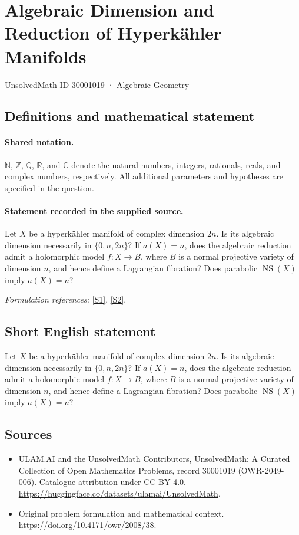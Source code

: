 \documentclass[11pt]{article}
\newcommand{\sref}[2]{\hyperlink{source:#1:#2}{[S#2]}}
\begin{document}
\setcounter{section}{30001018}
\section{Algebraic Dimension and Reduction of Hyperkähler Manifolds}\label{30001019}
{\small UnsolvedMath ID 30001019 · Algebraic Geometry}
\subsection{Definitions and mathematical statement}

\paragraph{Shared notation.}$\mathbb N$, $\mathbb Z$, $\mathbb Q$, $\mathbb R$, and $\mathbb C$ denote the natural numbers, integers, rationals, reals, and complex numbers, respectively. All additional parameters and hypotheses are specified in the question.


\paragraph{Statement recorded in the supplied source.}
Let $X$ be a hyperkähler manifold of complex dimension $2n$. Is its algebraic dimension necessarily in $\{0,n,2n\}$? If $a(X)=n$, does the algebraic reduction admit a holomorphic model $f:X\to B$, where $B$ is a normal projective variety of dimension $n$, and hence define a Lagrangian fibration? Does parabolic $\operatorname{NS}(X)$ imply $a(X)=n$?
\par\smallskip\textit{Formulation references:} \sref{30001019}{1}, \sref{30001019}{2}.
\subsection{Short English statement}
Let $X$ be a hyperkähler manifold of complex dimension $2n$. Is its algebraic dimension necessarily in $\{0,n,2n\}$? If $a(X)=n$, does the algebraic reduction admit a holomorphic model $f:X\to B$, where $B$ is a normal projective variety of dimension $n$, and hence define a Lagrangian fibration? Does parabolic $\operatorname{NS}(X)$ imply $a(X)=n$?
\subsection{Sources}
\begin{itemize}
\item[\hypertarget{source:30001019:1}{S1}] ULAM.AI and the UnsolvedMath Contributors, UnsolvedMath: A Curated Collection of Open Mathematics Problems, record 30001019 (OWR-2049-006). Catalogue attribution under CC BY 4.0.
\url{https://huggingface.co/datasets/ulamai/UnsolvedMath}.
\item[\hypertarget{source:30001019:2}{S2}] Original problem formulation and mathematical context.
\url{https://doi.org/10.4171/owr/2008/38}.
\end{itemize}
\label{end:30001019}
\end{document}

